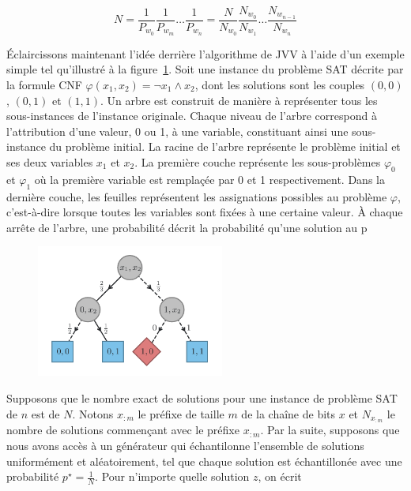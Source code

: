 \begin{equation}
    N = \frac{1}{P_{w_{0}}} \frac{1}{P_{w_{m}}} \dots \frac{1}{P_{w_{n}}} = \frac{N}{N_{w_{0}}} \frac{N_{w_{0}}}{N_{w_{1}}} \dots \frac{N_{w_{n-1}}}{N_{w_{n}}}
\end{equation}

Éclaircissons maintenant l'idée derrière l'algorithme de JVV à l'aide d'un exemple simple tel qu'illustré à la figure~\ref{fig:algorithme-jvv}. Soit une instance du problème SAT décrite par la formule CNF $\varphi(x_{1}, x_{2}) = \neg x_{1} \land x_{2}$, dont les solutions sont les couples $(0,0)$, $(0,1)$ et $(1,1)$. Un arbre est construit de manière à représenter tous les sous-instances de l'instance originale. Chaque niveau de l'arbre correspond à l'attribution d'une valeur, 0 ou 1, à une variable, constituant ainsi une sous-instance du problème initial. La racine de l'arbre représente le problème initial et ses deux variables $x_{1}$ et $x_{2}$. La première couche représente les sous-problèmes $\varphi_{0}$ et $\varphi_{1}$ où la première variable est remplaçée par 0 et 1 respectivement. Dans la dernière couche, les feuilles représentent les assignations possibles au problème $\varphi$, c'est-à-dire lorsque toutes les variables sont fixées à une certaine valeur. À chaque arrête de l'arbre, une probabilité décrit la probabilité qu'une solution au p


\begin{figure}[h]
    \centering
    \includegraphics[width=0.55\textwidth]{figures/jvv-algorithm.pdf}
    \caption[Algorithme de Jerrum-Valiant-Vazirani]{}
    \label{fig:algorithme-jvv}
\end{figure}

Supposons que le nombre exact de solutions pour une instance de problème SAT de $n$ est de $N$. Notons $x_{:m}$ le préfixe de taille $m$ de la chaîne de bits $x$ et $N_{x_{:m}}$ le nombre de solutions commençant avec le préfixe $x_{:m}$. Par la suite, supposons que nous avons accès à un générateur qui échantilonne l'ensemble de solutions uniformément et aléatoirement, tel que chaque solution est échantillonée avec une probabilité $p^{\star} = \frac{1}{N}$. Pour n'importe quelle solution $z$, on écrit

